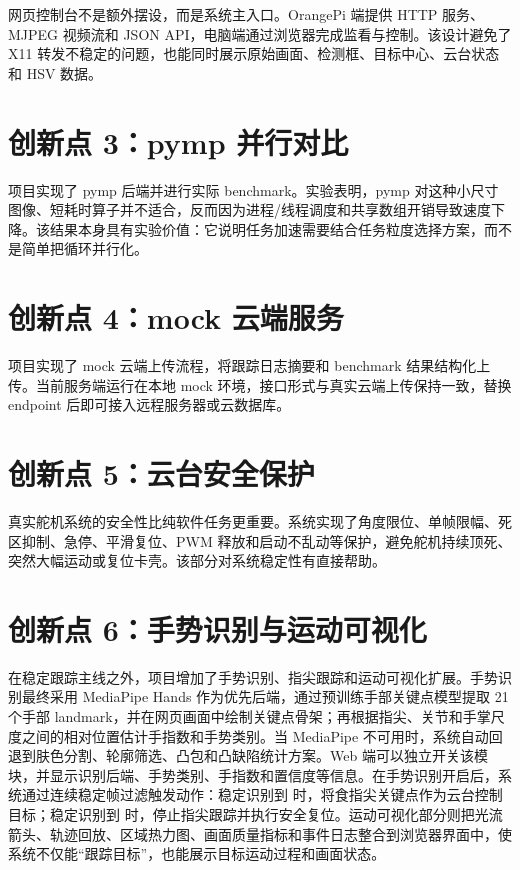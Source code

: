 \documentclass[
  oneside,
  degree=bachelor,
  field=science,
  fullwidthstop=circle,
  fontset=windows,
  times=false,
  minted=false,
  biblatex=false,
  algo=algpseudocode,
]{tongjithesis}
\newcommand{\code}[1]{\texttt{\detokenize{#1}}}
\begin{document}
网页控制台不是额外摆设，而是系统主入口。OrangePi 端提供 HTTP 服务、MJPEG 视频流和 JSON API，电脑端通过浏览器完成监看与控制。该设计避免了 X11 转发不稳定的问题，也能同时展示原始画面、检测框、目标中心、云台状态和 HSV 数据。

\section{创新点 3：pymp 并行对比}

项目实现了 pymp 后端并进行实际 benchmark。实验表明，pymp 对这种小尺寸图像、短耗时算子并不适合，反而因为进程/线程调度和共享数组开销导致速度下降。该结果本身具有实验价值：它说明任务加速需要结合任务粒度选择方案，而不是简单把循环并行化。

\section{创新点 4：mock 云端服务}

项目实现了 mock 云端上传流程，将跟踪日志摘要和 benchmark 结果结构化上传。当前服务端运行在本地 mock 环境，接口形式与真实云端上传保持一致，替换 endpoint 后即可接入远程服务器或云数据库。

\section{创新点 5：云台安全保护}

真实舵机系统的安全性比纯软件任务更重要。系统实现了角度限位、单帧限幅、死区抑制、急停、平滑复位、PWM 释放和启动不乱动等保护，避免舵机持续顶死、突然大幅运动或复位卡壳。该部分对系统稳定性有直接帮助。

\section{创新点 6：手势识别与运动可视化}

在稳定跟踪主线之外，项目增加了手势识别、指尖跟踪和运动可视化扩展。手势识别最终采用 MediaPipe Hands 作为优先后端，通过预训练手部关键点模型提取 21 个手部 landmark，并在网页画面中绘制关键点骨架；再根据指尖、关节和手掌尺度之间的相对位置估计手指数和手势类别。当 MediaPipe 不可用时，系统自动回退到肤色分割、轮廓筛选、凸包和凸缺陷统计方案。Web 端可以独立开关该模块，并显示识别后端、手势类别、手指数和置信度等信息。在手势识别开启后，系统通过连续稳定帧过滤触发动作：稳定识别到 \code{one} 时，将食指尖关键点作为云台控制目标；稳定识别到 \code{ok} 时，停止指尖跟踪并执行安全复位。运动可视化部分则把光流箭头、轨迹回放、区域热力图、画面质量指标和事件日志整合到浏览器界面中，使系统不仅能“跟踪目标”，也能展示目标运动过程和画面状态。
\end{document}
